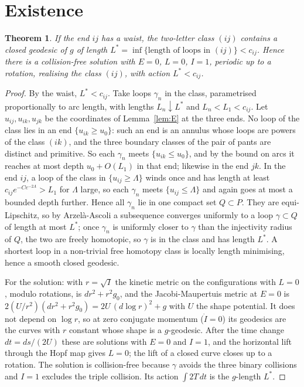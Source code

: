 \documentclass[11pt]{article}
\newtheorem{theorem}{Theorem}
\theoremstyle{definition}
\begin{document}
\section{Existence}

\begin{theorem}\label{thm:exist}
If the end $ij$ has a waist, the two-letter class $(ij)$ contains a closed geodesic of $g$ of length
$L^*=\inf\{\text{length of loops in }(ij)\}<c_{ij}$. Hence there is a collision-free solution with $E=0$, $L=0$, $I=1$,
periodic up to a rotation, realising the class $(ij)$, with action $L^*<c_{ij}$.
\end{theorem}

\begin{proof}
By the waist, $L^*<c_{ij}$. Take loops $\gamma_n$ in the class, parametrised proportionally to arc length, with lengths
$L_n\downarrow L^*$ and $L_n<L_1<c_{ij}$. Let $u_{ij},u_{ik},u_{jk}$ be the coordinates of Lemma~\ref{lem:E} at the three
ends. No loop of the class lies in an end $\{u_{ik}\ge u_0\}$: such an end is an annulus whose loops are powers of the
class $(ik)$, and the three boundary classes of the pair of pants are distinct and primitive. So each $\gamma_n$ meets
$\{u_{ik}\le u_0\}$, and by the bound on arcs it reaches at most depth $u_0+O(L_1)$ in that end; likewise in the end
$jk$. In the end $ij$, a loop of the class in $\{u_{ij}\ge\Lambda\}$ winds once and has length at least
$c_{ij}e^{-Ce^{-2\Lambda}}>L_1$ for $\Lambda$ large, so each $\gamma_n$ meets $\{u_{ij}\le\Lambda\}$ and again goes at most a bounded
depth further. Hence all $\gamma_n$ lie in one compact set $Q\subset P$. They are equi-Lipschitz, so by Arzel\`a-Ascoli
a subsequence converges uniformly to a loop $\gamma\subset Q$ of length at most $L^*$; once $\gamma_n$ is uniformly
closer to $\gamma$ than the injectivity radius of $Q$, the two are freely homotopic, so $\gamma$ is in the class and has
length $L^*$. A shortest loop in a non-trivial free homotopy class is locally length minimising, hence a smooth
closed geodesic.

For the solution: with $r=\sqrt I$ the kinetic metric on the configurations with $L=0$, modulo rotations, is
$dr^2+r^2g_0$, and the Jacobi-Maupertuis metric at $E=0$ is $2(U/r^2)(dr^2+r^2g_0)=2U\,(d\log r)^2+g$ with $U$ the
shape potential. It does not depend on $\log r$, so at zero conjugate momentum ($\dot I=0$) its geodesics are the curves
with $r$ constant whose shape is a $g$-geodesic. After the time change $dt=ds/(2U)$ these are solutions with $E=0$ and
$I=1$, and the horizontal lift through the Hopf map gives $L=0$; the lift of a closed curve closes up to a rotation. The
solution is collision-free because $\gamma$ avoids the three binary collisions and $I=1$ excludes the triple
collision. Its action $\int2T\,dt$ is the $g$-length $L^*$.
\end{proof}
\end{document}
